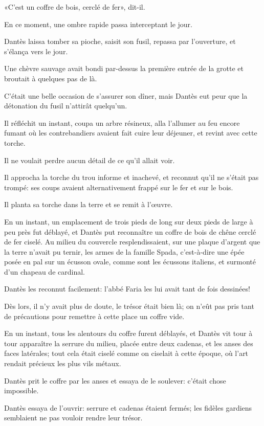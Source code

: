 «C'est un coffre de bois, cerclé de fer», dit-il.

En ce moment, une ombre rapide passa interceptant le jour.

Dantès laissa tomber sa pioche, saisit son fusil, repassa par l'ouverture, et s'élança vers le jour.

Une chèvre sauvage avait bondi par-dessus la première entrée de la grotte et broutait à quelques pas de là.

C'était une belle occasion de s'assurer son dîner, mais Dantès eut peur que la détonation du fusil n'attirât quelqu'un.

Il réfléchit un instant, coupa un arbre résineux, alla l'allumer au feu encore fumant où les contrebandiers avaient fait cuire leur déjeuner, et revint avec cette torche.

Il ne voulait perdre aucun détail de ce qu'il allait voir.

Il approcha la torche du trou informe et inachevé, et reconnut qu'il ne s'était pas trompé: ses coups avaient alternativement frappé sur le fer et sur le bois.

Il planta sa torche dans la terre et se remit à l'œuvre.

En un instant, un emplacement de trois pieds de long sur deux pieds de large à peu près fut déblayé, et Dantès put reconnaître un coffre de bois de chêne cerclé de fer ciselé. Au milieu du couvercle resplendissaient, sur une plaque d'argent que la terre n'avait pu ternir, les armes de la famille Spada, c'est-à-dire une épée posée en pal sur un écusson ovale, comme sont les écussons italiens, et surmonté d'un chapeau de cardinal.

Dantès les reconnut facilement: l'abbé Faria les lui avait tant de fois dessinées!

Dès lors, il n'y avait plus de doute, le trésor était bien là; on n'eût pas pris tant de précautions pour remettre à cette place un coffre vide.

En un instant, tous les alentours du coffre furent déblayés, et Dantès vit tour à tour apparaître la serrure du milieu, placée entre deux cadenas, et les anses des faces latérales; tout cela était ciselé comme on ciselait à cette époque, où l'art rendait précieux les plus vils métaux.

Dantès prit le coffre par les anses et essaya de le soulever: c'était chose impossible.

Dantès essaya de l'ouvrir: serrure et cadenas étaient fermés; les fidèles gardiens semblaient ne pas vouloir rendre leur trésor.

